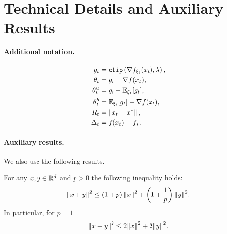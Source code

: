 \documentclass{article}
\begin{document}




\newpage
\appendix

\tableofcontents

\newpage



\section{Technical Details and Auxiliary Results}\label{appendix-auxiliary}
\paragraph{Additional notation.} 
\begin{align*}
    g_t &= \texttt{clip}\left(\nabla f_{\xi_t}(x_t), \lambda\right),\\
    \theta_t &= g_t - \nabla f(x_t),\\
    \theta_t^u &= g_t - {\mathbb E}_{\xi_t} [g_t],\\ 
    \theta_t^b &= {\mathbb E}_{\xi_t}[g_t] - \nabla f(x_t),\\
    R_t &= \left\lVert x_t - x^*\right\rVert,\\
    \Delta_t &= f(x_t) - f_*.
\end{align*}


\paragraph{Auxiliary results.} We also use the following  results.

\begin{proposition}
    \label{prop: young}
    For any $x, y \in {\mathbb R}^d$ and $p > 0$ the following inequality holds:
    \begin{align*}
        {\left\lVert x + y\right\rVert}^2 \leq \left(1 + p\right){\left\lVert x\right\rVert}^2 + \left(1 + \frac{1}{p}\right){\left\lVert y\right\rVert}^2.
    \end{align*}
    In particular, for $p = 1$
    \begin{align*}
        {\left\lVert x + y\right\rVert}^2 \leq 2{\left\lVert x\right\rVert}^2 + 2{\left\lVert y\right\rVert}^2.
    \end{align*}
\end{proposition}
\end{document}
